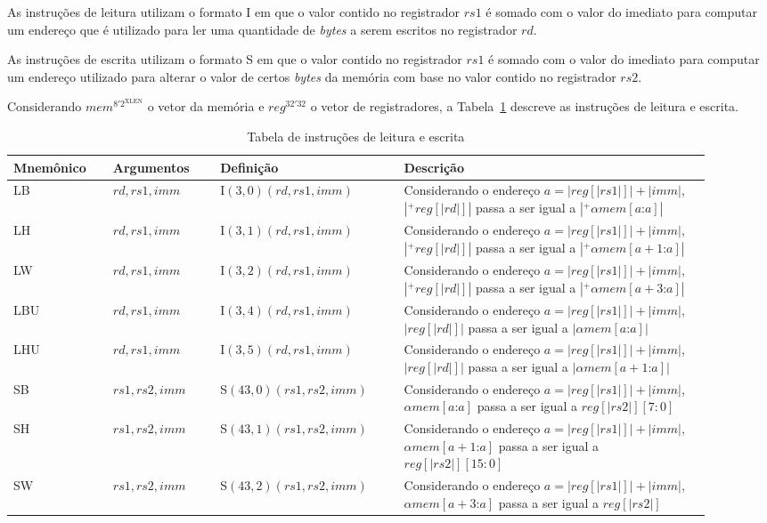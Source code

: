    As instruções de leitura utilizam o formato I em que o valor contido no registrador $rs1$ é somado com o valor
    do imediato para computar um endereço que é utilizado para ler uma quantidade de \emph{bytes} a serem escritos
    no registrador $rd$.

    As instruções de escrita utilizam o formato S em que o valor contido no registrador $rs1$ é somado com o valor 
    do imediato para computar um endereço utilizado para alterar o valor de certos \emph{bytes} da memória com 
    base no valor contido no registrador $rs2$.

    Considerando $mem^{8'2^\text{XLEN}}$ o vetor da memória e $reg^{32'32}$ o vetor de registradores, a
    Tabela~\ref{tab:rw32} descreve as instruções de leitura e escrita.

    \begin{table}
      \begin{tabular}{ |p{0.13\linewidth}||p{0.14\linewidth}|p{0.24\linewidth}|p{0.40\linewidth}| } 
        \hline
        Mnemônico & Argumentos & Definição & Descrição\\ \hline \hline

  LB & $rd, rs1, imm$ & I$(3, 0)(rd, rs1, imm)$ & Considerando o endereço $a = |reg[|rs1|]| + |imm|$, $|^+reg[|rd|]|$ passa a ser igual a $|^+ \alpha mem[a\text{:}a]|$ \\ \hline
  LH & $rd, rs1, imm$ & I$(3, 1)(rd, rs1, imm)$ & Considerando o endereço $a = |reg[|rs1|]| + |imm|$, $|^+reg[|rd|]|$ passa a ser igual a $|^+ \alpha mem[a+1\text{:}a]|$ \\ \hline
  LW & $rd, rs1, imm$ & I$(3, 2)(rd, rs1, imm)$ & Considerando o endereço $a = |reg[|rs1|]| + |imm|$, $|^+reg[|rd|]|$ passa a ser igual a $|^+ \alpha mem[a+3\text{:}a]|$ \\ \hline
  LBU & $rd, rs1, imm$ & I$(3, 4)(rd, rs1, imm)$ & Considerando o endereço $a = |reg[|rs1|]| + |imm|$, $|reg[|rd|]|$ passa a ser igual a $|\alpha mem[a\text{:}a]|$  \\ \hline
  LHU & $rd, rs1, imm$ & I$(3, 5)(rd, rs1, imm)$ & Considerando o endereço $a = |reg[|rs1|]| + |imm|$, $|reg[|rd|]|$ passa a ser igual a $|\alpha mem[a+1\text{:}a]|$ \\ \hline
  SB & $rs1, rs2, imm$ & S$(43, 0)(rs1, rs2, imm)$ & Considerando o endereço $a = |reg[|rs1|]| + |imm|$, $\alpha mem[a\text{:}a]$ passa a ser igual a $reg[|rs2|][7:0]$ \\ \hline
  SH & $rs1, rs2, imm$ & S$(43, 1)(rs1, rs2, imm)$ & Considerando o endereço $a = |reg[|rs1|]| + |imm|$, $\alpha mem[a+1\text{:}a]$ passa a ser igual a $reg[|rs2|][15:0]$\\ \hline
  SW & $rs1, rs2, imm$ & S$(43, 2)(rs1, rs2, imm)$ & Considerando o endereço $a = |reg[|rs1|]| + |imm|$, $\alpha mem[a+3\text{:}a]$ passa a ser igual a $reg[|rs2|]$\\ \hline

      \end{tabular}
    \caption{Tabela de instruções de leitura e escrita \label{tab:rw32}}
    \end{table}

